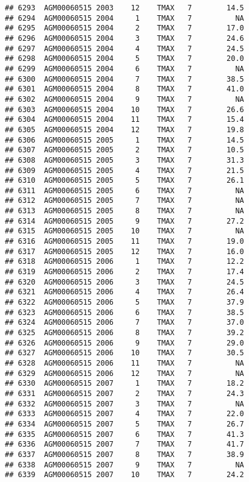 \documentclass{article}\usepackage[]{graphicx}\usepackage[]{color}
\makeatletter
\newenvironment{kframe}{%
 \def\at@end@of@kframe{}%
 \ifinner\ifhmode%
  \def\at@end@of@kframe{\end{minipage}}%
  \begin{minipage}{\columnwidth}%
 \fi\fi%
 \def\FrameCommand##1{\hskip\@totalleftmargin \hskip-\fboxsep
 \colorbox{shadecolor}{##1}\hskip-\fboxsep
     \hskip-\linewidth \hskip-\@totalleftmargin \hskip\columnwidth}%
 \MakeFramed {\advance\hsize-\width
   \@totalleftmargin\z@ \linewidth\hsize
   \@setminipage}}%
 {\par\unskip\endMakeFramed%
 \at@end@of@kframe}
\newenvironment{knitrout}{}{} %
\makeatother
\begin{document}
\begin{knitrout}
\begin{kframe}
\begin{verbatim}
## 6293  AGM00060515 2003    12    TMAX   7        14.5
## 6294  AGM00060515 2004     1    TMAX   7          NA
## 6295  AGM00060515 2004     2    TMAX   7        17.0
## 6296  AGM00060515 2004     3    TMAX   7        24.6
## 6297  AGM00060515 2004     4    TMAX   7        24.5
## 6298  AGM00060515 2004     5    TMAX   7        20.0
## 6299  AGM00060515 2004     6    TMAX   7          NA
## 6300  AGM00060515 2004     7    TMAX   7        38.5
## 6301  AGM00060515 2004     8    TMAX   7        41.0
## 6302  AGM00060515 2004     9    TMAX   7          NA
## 6303  AGM00060515 2004    10    TMAX   7        26.6
## 6304  AGM00060515 2004    11    TMAX   7        15.4
## 6305  AGM00060515 2004    12    TMAX   7        19.8
## 6306  AGM00060515 2005     1    TMAX   7        14.5
## 6307  AGM00060515 2005     2    TMAX   7        10.5
## 6308  AGM00060515 2005     3    TMAX   7        31.3
## 6309  AGM00060515 2005     4    TMAX   7        21.5
## 6310  AGM00060515 2005     5    TMAX   7        26.1
## 6311  AGM00060515 2005     6    TMAX   7          NA
## 6312  AGM00060515 2005     7    TMAX   7          NA
## 6313  AGM00060515 2005     8    TMAX   7          NA
## 6314  AGM00060515 2005     9    TMAX   7        27.2
## 6315  AGM00060515 2005    10    TMAX   7          NA
## 6316  AGM00060515 2005    11    TMAX   7        19.0
## 6317  AGM00060515 2005    12    TMAX   7        16.0
## 6318  AGM00060515 2006     1    TMAX   7        12.2
## 6319  AGM00060515 2006     2    TMAX   7        17.4
## 6320  AGM00060515 2006     3    TMAX   7        24.5
## 6321  AGM00060515 2006     4    TMAX   7        26.4
## 6322  AGM00060515 2006     5    TMAX   7        37.9
## 6323  AGM00060515 2006     6    TMAX   7        38.5
## 6324  AGM00060515 2006     7    TMAX   7        37.0
## 6325  AGM00060515 2006     8    TMAX   7        39.2
## 6326  AGM00060515 2006     9    TMAX   7        29.0
## 6327  AGM00060515 2006    10    TMAX   7        30.5
## 6328  AGM00060515 2006    11    TMAX   7          NA
## 6329  AGM00060515 2006    12    TMAX   7          NA
## 6330  AGM00060515 2007     1    TMAX   7        18.2
## 6331  AGM00060515 2007     2    TMAX   7        24.3
## 6332  AGM00060515 2007     3    TMAX   7          NA
## 6333  AGM00060515 2007     4    TMAX   7        22.0
## 6334  AGM00060515 2007     5    TMAX   7        26.7
## 6335  AGM00060515 2007     6    TMAX   7        41.3
## 6336  AGM00060515 2007     7    TMAX   7        41.7
## 6337  AGM00060515 2007     8    TMAX   7        38.9
## 6338  AGM00060515 2007     9    TMAX   7          NA
## 6339  AGM00060515 2007    10    TMAX   7        24.2

\end{verbatim}
\end{kframe}
\end{knitrout}
\end{document}
